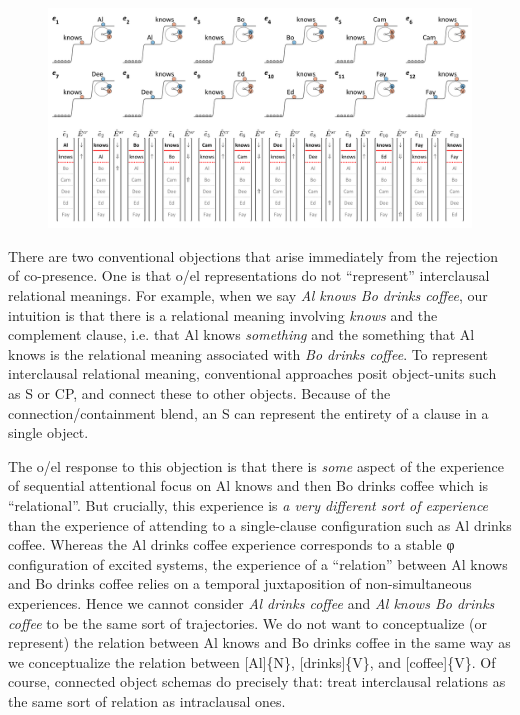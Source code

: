   
\begin{figure}
\includegraphics[width=\textwidth]{figures/Tilsen-img106.png}
\caption{\missingcaption}
\label{fig:}
\end{figure}
 

  There are two conventional objections that arise immediately from the rejection of co-presence. One is that o/el representations do not “represent” interclausal relational meanings. For example, when we say \textit{Al knows Bo drinks coffee}, our intuition is that there is a relational meaning involving \textit{knows} and the complement clause, i.e. that Al knows \textit{something} and the something that Al knows is the relational meaning associated with \textit{Bo drinks coffee}. To represent interclausal relational meaning, conventional approaches posit object-units such as S or CP, and connect these to other objects. Because of the connection/containment blend, an S can represent the entirety of a clause in a single object. 

  The o/el response to this objection is that there is \textit{some} aspect of the experience of sequential attentional focus on {\textbar}Al knows{\textbar} and then {\textbar}Bo drinks coffee{\textbar} which is “relational”. But crucially, this experience is \textit{a very different sort of experience} than the experience of attending to a single-clause configuration such as {\textbar}Al drinks coffee{\textbar}. Whereas the {\textbar}Al drinks coffee{\textbar} experience corresponds to a stable φ configuration of excited systems, the experience of a “relation” between {\textbar}Al knows{\textbar} and {\textbar}Bo drinks coffee{\textbar} relies on a temporal juxtaposition of non-simultaneous experiences. Hence we cannot consider \textit{Al drinks coffee} and \textit{Al knows Bo drinks coffee} to be the same sort of trajectories. We do not want to conceptualize (or represent) the relation between {\textbar}Al knows{\textbar} and {\textbar}Bo drinks coffee{\textbar} in the same way as we conceptualize the relation between [Al]\{N\}, [drinks]\{V\}, and [coffee]\{V\}. Of course, connected object schemas do precisely that: treat interclausal relations as the same sort of relation as intraclausal ones.

